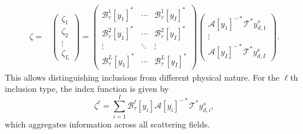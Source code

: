 \documentclass[onefignum,onetabnum]{siamart190516}
\numberwithin{equation}{section}
\begin{document}
\begin{align*}
\zeta =& \begin{pmatrix} \zeta_{1} \\ \zeta_{2} \\ \vdots \\ \zeta_{L} \end{pmatrix}
= \begin{pmatrix}
\mathcal{B}^{1}_{\tau}[y_{1}]^{*} & \cdots & \mathcal{B}^{1}_{\tau}[y_{I}]^{*} \\
\mathcal{B}^{2}_{\tau}[y_{1}]^{*} & \cdots & \mathcal{B}^{2}_{\tau}[y_{I}]^{*} \\
\vdots & \ddots & \vdots \\
\mathcal{B}^{L}_{\tau}[y_{1}]^{*} & \cdots & \mathcal{B}^{L}_{\tau}[y_{I}]^{*}
\end{pmatrix} \begin{pmatrix} \mathcal{A}[y_{1}]^{-*}\mathcal{T}^{*}y^{s}_{d,1} \\ \vdots \\ \mathcal{A}[y_{I}]^{-*}\mathcal{T}^{*}y^{s}_{d,I} \end{pmatrix}.
\end{align*}
This allows distinguishing inclusions from different physical nature. For the $\ell$th inclusion  type, the index function is given by
\begin{equation*}
\zeta^{\ell} = \sum_{i=1}^{I} \mathcal{B}_{\tau}^{\ell}[y_{i}] \mathcal{A}[y_{i}]^{-*} \mathcal{T}^{*} y^{s}_{d,i},
\end{equation*}
which aggregates information across all scattering fields.
\end{document}
